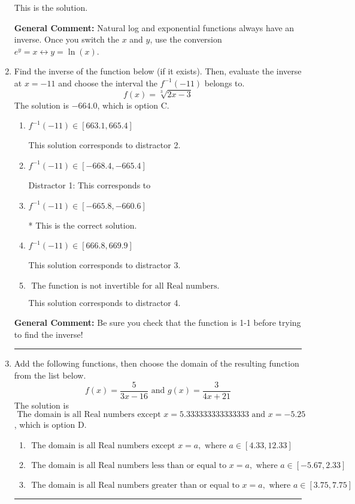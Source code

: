 \documentclass{extbook}[14pt]
\newcommand{\litem}[1]{\item #1

\rule{\textwidth}{0.4pt}}
\begin{document}
\begin{enumerate}
{\begin{enumerate}[label=\Alph*.]
 This is the solution.
\end{enumerate}

\textbf{General Comment:} Natural log and exponential functions always have an inverse. Once you switch the $x$ and $y$, use the conversion $ e^y = x \leftrightarrow y=\ln(x)$.
}
\litem{
Find the inverse of the function below (if it exists). Then, evaluate the inverse at $x = -11$ and choose the interval the $f^{-1}(-11)$ belongs to.
\[ f(x) = \sqrt[3]{2 x - 3} \]The solution is \( -664.0 \), which is option C.\begin{enumerate}[label=\Alph*.]
\item \( f^{-1}(-11) \in [663.1, 665.4] \)

 This solution corresponds to distractor 2.
\item \( f^{-1}(-11) \in [-668.4, -665.4] \)

 Distractor 1: This corresponds to 
\item \( f^{-1}(-11) \in [-665.8, -660.6] \)

* This is the correct solution.
\item \( f^{-1}(-11) \in [666.8, 669.9] \)

 This solution corresponds to distractor 3.
\item \( \text{ The function is not invertible for all Real numbers. } \)

 This solution corresponds to distractor 4.
\end{enumerate}

\textbf{General Comment:} Be sure you check that the function is 1-1 before trying to find the inverse!
}
\litem{
Add the following functions, then choose the domain of the resulting function from the list below.
\[ f(x) = \frac{5}{3x-16} \text{ and } g(x) = \frac{3}{4x+21} \]The solution is \( \text{ The domain is all Real numbers except } x = 5.333333333333333 \text{ and } x = -5.25 \), which is option D.\begin{enumerate}[label=\Alph*.]
\item \( \text{ The domain is all Real numbers except } x = a, \text{ where } a \in [4.33, 12.33] \)


\item \( \text{ The domain is all Real numbers less than or equal to } x = a, \text{ where } a \in [-5.67, 2.33] \)


\item \( \text{ The domain is all Real numbers greater than or equal to } x = a, \text{ where } a \in [3.75, 7.75] \)



\end{enumerate}}
\end{enumerate}
\end{document}
